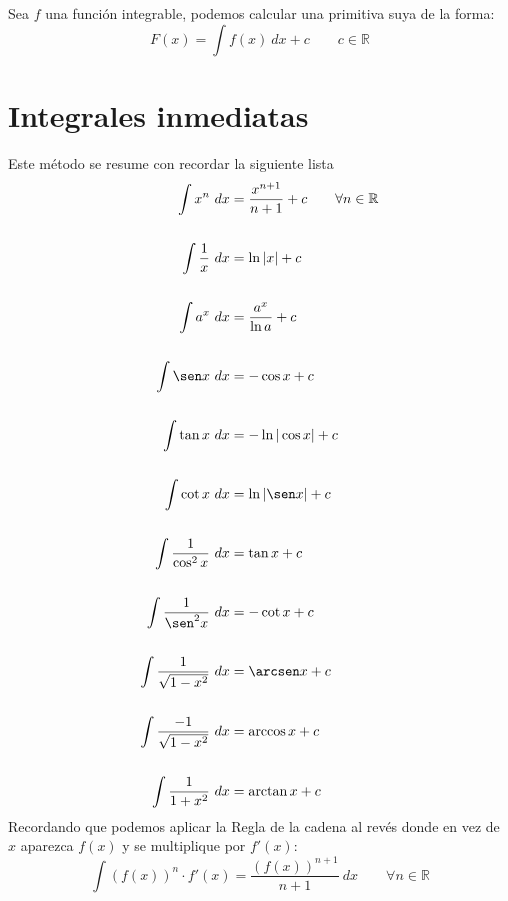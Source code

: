 \begin{prop}
    Sea $f$ una función integrable, podemos calcular una primitiva suya de la forma:
    \begin{equation*}
        F(x) = \int f(x)~dx + c \qquad c\in \mathbb{R}
    \end{equation*}
\end{prop}

\section{Integrales inmediatas}
Este método se resume con recordar la siguiente lista
\begin{align*}
        \displaystyle \int x^n~dx &= \frac{x^{n+1}}{n+1} + c \qquad \forall n\in \mathbb{R}\\\\
        \displaystyle \int \frac{1}{x}~dx &= \ln |x| + c \\\\
        \displaystyle\int a^x~dx  &= \dfrac{a^x}{\ln a} + c \\\\
        \displaystyle\int \sen x~dx  &= -\cos x + c \\\\
        \displaystyle\int \tan x~dx  &= -\ln |\cos x| + c \\\\
        \displaystyle\int \cot x~dx  &= \ln|\sen x| + c \\\\
        \displaystyle\int \frac{1}{\cos^2 x}~dx  &= \tan x + c \\\\
        \displaystyle\int \frac{1}{\sen^2 x}~dx &= -\cot x + c \\\\
        \displaystyle \int \frac{1}{\sqrt{1-x^2}}~dx  &= \arcsen x + c \\\\
        \displaystyle \int \frac{-1}{\sqrt{1-x^2}}~dx  &= \arccos x + c \\\\
        \displaystyle \int \frac{1}{1+x^2}~dx  &= \arctan x + c
\end{align*}
Recordando que podemos aplicar la Regla de la cadena al revés donde en vez de $x$ aparezca $f(x)$ y se multiplique por $f'(x)$:
\begin{equation*}
    \displaystyle\int {(f(x))}^n \cdot f'(x) = \frac{{(f(x))}^{n+1}}{n+1}~dx \qquad \forall n\in \mathbb{R}
\end{equation*}

